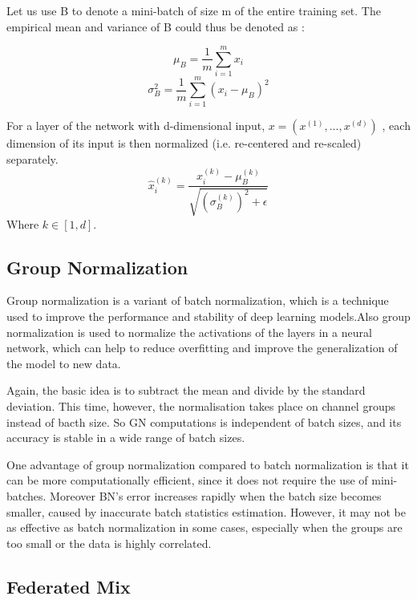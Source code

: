 \documentclass[conference]{IEEEtran}
\begin{document}
Let us use B to denote a mini-batch of size m of the entire training set. The empirical mean and variance of B could thus be denoted as \cite{b8}:

\begin{multicols}{2}
  \begin{equation}
    \mu _{B}={\frac {1}{m}}\sum _{i=1}^{m}x_{i}
  \end{equation}\break
  \begin{equation}
    \sigma _{B}^{2}={\frac {1}{m}}\sum _{i=1}^{m}(x_{i}-\mu _{B})^{2}
  \end{equation}
\end{multicols}

For a layer of the network with d-dimensional input, $x = (x^{(1)},...,x^{(d)})$ , each dimension of its input is then normalized (i.e. re-centered and re-scaled) separately. 
\begin{equation}
 {\hat {x}}_{i}^{(k)}={\frac {x_{i}^{(k)}-\mu _{B}^{(k)}}{\sqrt {\left(\sigma _{B}^{(k)}\right)^{2}+\epsilon }}}
\end{equation}
Where $k \in [1,d]$.

\subsection{Group Normalization}

Group normalization is a variant of batch normalization, which is a technique used to improve the performance and stability of deep learning models.Also group normalization is used to normalize the activations of the layers in a neural network, which can help to reduce overfitting and improve the generalization of the model to new data. 

Again, the basic idea is to subtract the mean and divide by the standard deviation. This time, however, the normalisation takes place on channel groups instead of bacth size. So GN computations is independent of batch sizes, and its accuracy is stable in a wide range of batch sizes.

One advantage of group normalization compared to batch normalization is that it can be more computationally efficient, since it does not require the use of mini-batches. Moreover BN’s error increases rapidly when the batch size becomes smaller, caused by inaccurate batch statistics estimation. However, it may not be as effective as batch normalization in some cases, especially when the groups are too small or the data is highly correlated.

\subsection{\textbf{Federated Mix}}
\end{document}
